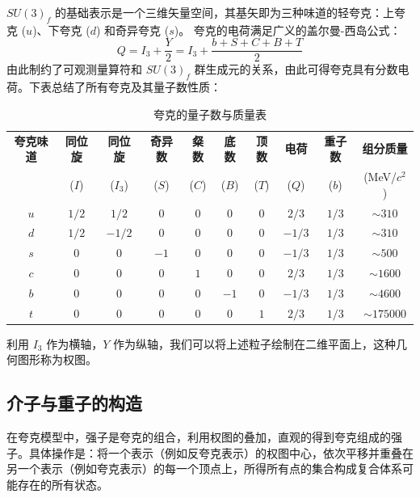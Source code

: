 $SU(3)_f$ 的基础表示是一个三维矢量空间，其基矢即为三种味道的轻夸克：上夸克 ($u$)、下夸克 ($d$) 和奇异夸克 ($s$)。
夸克的电荷满足广义的盖尔曼-西岛公式：
$$Q = I_3 + \frac{Y}{2} = I_3 + \frac{b + S + C + B + T}{2}$$
由此制约了可观测量算符和 $SU(3)_f$ 群生成元的关系，由此可得夸克具有分数电荷。下表总结了所有夸克及其量子数性质：
\begin{table}[H]
    \centering
    \renewcommand{\arraystretch}{1.3}
    \setlength{\tabcolsep}{4pt}
    \begin{tabular}{|c|c|c|c|c|c|c|c|c|c|}
    \hline
    \textbf{夸克味道} & \textbf{同位旋} & \textbf{同位旋} & \textbf{奇异数} & \textbf{粲数} & \textbf{底数} & \textbf{顶数} & \textbf{电荷} & \textbf{重子数} & \textbf{组分质量} \\
     & ($I$) & ($I_3$) & ($S$) & ($C$) & ($B$) & ($T$) & ($Q$) & ($b$) & (MeV/$c^2$) \\ \hline
    $u$ & $1/2$ & $1/2$ & $0$ & $0$ & $0$ & $0$ & $2/3$ & $1/3$ & $\sim 310$ \\ \hline
    $d$ & $1/2$ & $-1/2$ & $0$ & $0$ & $0$ & $0$ & $-1/3$ & $1/3$ & $\sim 310$ \\ \hline
    $s$ & $0$ & $0$ & $-1$ & $0$ & $0$ & $0$ & $-1/3$ & $1/3$ & $\sim 500$ \\ \hline
    $c$ & $0$ & $0$ & $0$ & $1$ & $0$ & $0$ & $2/3$ & $1/3$ & $\sim 1600$ \\ \hline
    $b$ & $0$ & $0$ & $0$ & $0$ & $-1$ & $0$ & $-1/3$ & $1/3$ & $\sim 4600$ \\ \hline
    $t$ & $0$ & $0$ & $0$ & $0$ & $0$ & $1$ & $2/3$ & $1/3$ & $\sim 175000$ \\ \hline
    \end{tabular}
    \caption{夸克的量子数与质量表}
\end{table}

利用 $I_3$ 作为横轴，$Y$ 作为纵轴，我们可以将上述粒子绘制在二维平面上，这种几何图形称为权图。
\subsection{介子与重子的构造}
在夸克模型中，强子是夸克的组合，利用权图的叠加，直观的得到夸克组成的强子。具体操作是：将一个表示（例如反夸克表示）的权图中心，依次平移并重叠在另一个表示（例如夸克表示）的每一个顶点上，所得所有点的集合构成复合体系可能存在的所有状态。
